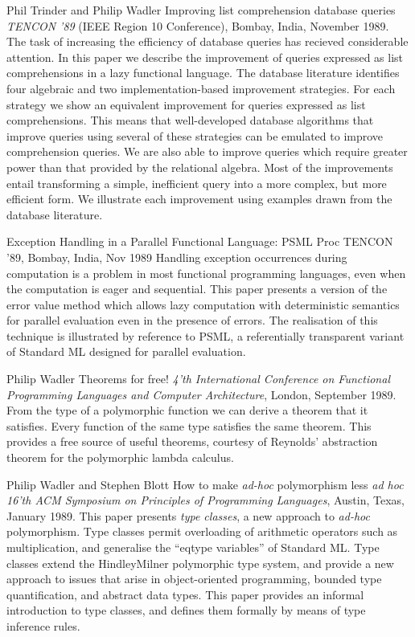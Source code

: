 {Phil Trinder and Philip Wadler}
{Improving list comprehension database queries}
{{\em TENCON '89\/} (IEEE Region 10 Conference),
Bombay, India, November 1989.}
{
The task of increasing the efficiency of database queries has recieved
considerable attention. In this paper we describe the improvement of
queries expressed as list comprehensions in a lazy functional
language. The database literature identifies four algebraic and two
implementation-based improvement strategies. For each strategy we show
an equivalent improvement for queries expressed as list
comprehensions.  This means that well-developed database algorithms
that improve queries using several of these strategies can be emulated
to improve comprehension queries.  We are also able to improve queries
which require greater power than that provided by the relational
algebra.  Most of the improvements entail transforming a simple,
inefficient query into a more complex, but more efficient form. We
illustrate each improvement using examples drawn from the database
literature.
}

{Exception Handling in a Parallel Functional Language: PSML}
{Proc TENCON '89, Bombay, India, Nov 1989}
{
Handling exception occurrences during computation is a problem  in  most
functional programming languages, even when the computation is eager and
sequential.  This paper presents a version of  the  error  value  method
which  allows lazy computation with deterministic semantics for parallel
evaluation even in the presence of  errors.   The  realisation  of  this
technique   is   illustrated  by  reference  to  PSML,  a  referentially
transparent variant of Standard ML designed for parallel evaluation.
}

{Philip Wadler}
{Theorems for free!}
{{\em 4'th International Conference on Functional Programming
Languages and Computer Architecture}, London, September 1989.}
{
From the type of a polymorphic function we can derive a theorem
that it satisfies.  Every function of the same type satisfies the same
theorem.  This provides a free source of useful theorems,
courtesy of Reynolds' abstraction theorem for the polymorphic lambda
calculus.
}

{Philip Wadler and Stephen Blott}
{How to make {\em ad-hoc\/} polymorphism less {\em ad hoc}}
{{\em 16'th ACM Symposium on Principles of Programming Languages},
Austin, Texas, January 1989.}
{
This paper presents {\em type classes}, a new approach to {\em
ad-hoc\/} polymorphism.  Type classes permit overloading of arithmetic
operators such as multiplication, and generalise the ``eqtype variables''
of Standard ML.
Type classes extend the Hindley\X Milner polymorphic type system, and
provide a new approach to issues that arise in object-oriented
programming, bounded type quantification, and abstract data types.
This paper provides an informal introduction to type classes, and
defines them formally by means of type inference rules.
}

